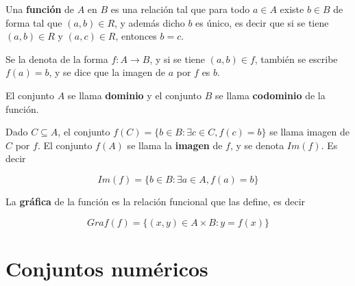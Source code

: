 \begin{definition}[Función]  \label{funcion}

Una \textbf{función} de $A$ en $B$ es una relación tal que para todo $a \in A$ existe $b \in B$ de forma tal que $(a,b) \in R$, y además dicho $b$ es único, es decir que si se tiene $(a,b) \in R$ y $(a,c) \in R$, entonces $b=c$.

Se la denota de la forma $f : A \to B$, y si se tiene $(a,b) \in f$, también se escribe $f(a) = b$, y se dice que la imagen de $a$ por $f$ es $b$.

El conjunto $A$ se llama \textbf{dominio}  y el conjunto $B$ se llama \textbf{codominio}  de la función.

Dado $C \subseteq A$, el conjunto $f(C) = \{b \in B : \exists c \in C, f(c) = b\}$ se llama imagen de $C$ por $f$.  El conjunto $f(A)$ se llama la \textbf{imagen}  de $f$, y se denota $Im(f)$.  Es decir

$$ Im(f) = \{ b \in B : \exists a \in A, f(a) = b \} $$

La \textbf{gráfica} de la función es la relación funcional que las define, es decir

$$ Graf(f) = \{ (x,y) \in A \times B : y = f(x) \} $$

\end{definition}



\section{Conjuntos numéricos}

